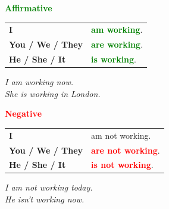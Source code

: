 \documentclass[a4paper,10pt]{article}
\newcommand{\sectiontitle}[2]{%
  {\large\bfseries\textcolor{#1}{#2}}%
}
\begin{document}
\begin{minipage}[t]{.485\textwidth}
\begin{greenbox}
  \sectiontitle{Green}{Affirmative}

  \vspace{0.75mm}
  \begin{tabular}{@{}>{\bfseries}l l@{}}
    I & \textcolor{Green}{\bfseries am working}.\\
    You / We / They & \textcolor{Green}{\bfseries are working}.\\
    He / She / It & \textcolor{Green}{\bfseries is working}.
  \end{tabular}

  \vspace{0.75mm}
  \textit{I am working now.}\\[-1mm]
  \textit{She is working in London.}
\end{greenbox}
\end{minipage}
\hfill
\begin{minipage}[t]{.485\textwidth}
\begin{redbox}
  \sectiontitle{Red}{Negative}

  \vspace{0.75mm}
  \begin{tabular}{@{}>{\bfseries}l l@{}}
    I & am not working.\\
    You / We / They & \textcolor{Red}{\bfseries are not working}.\\
    He / She / It & \textcolor{Red}{\bfseries is not working}.
  \end{tabular}

  \vspace{0.75mm}
  \textit{I am not working today.}\\[-1mm]
  \textit{He isn't working now.}
\end{redbox}
\end{minipage}

\vspace{1.35mm}
\end{document}
